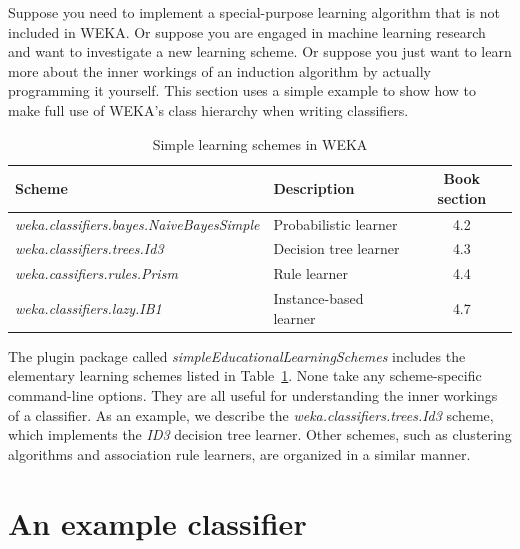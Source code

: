 Suppose you need to implement a special-purpose learning algorithm
that is not included in WEKA. Or suppose you are engaged in machine
learning research and want to investigate a new learning scheme. Or
suppose you just want to learn more about the inner workings of an
induction algorithm by actually programming it yourself. This section
uses a simple example to show how to make full use of WEKA's class
hierarchy when writing classifiers.

\begin{table}[!th]
\footnotesize
{\centering \begin{tabular}{llc}
\hline
Scheme & Description & Book section \\
\hline
\textit{weka.classifiers.bayes.NaiveBayesSimple} & Probabilistic learner & 4.2 \\
\textit{weka.classifiers.trees.Id3} & Decision tree learner & 4.3 \\
\textit{weka.cassifiers.rules.Prism} & Rule learner & 4.4 \\
\textit{weka.classifiers.lazy.IB1} & Instance-based learner & 4.7 \\
\hline
\end{tabular} \footnotesize \par}
\caption{\label{table:simple_schemes}Simple learning schemes in WEKA}
\end{table}


The plugin package called \textit{simpleEducationalLearningSchemes}
includes the elementary learning schemes listed in
Table~\ref{table:simple_schemes}. None take any scheme-specific
command-line options. They are all useful for understanding the inner
workings of a classifier. As an example, we describe
the \textit{weka.classifiers.trees.Id3} scheme, which implements
the \textit{ID3} decision tree learner. Other schemes, such as
clustering algorithms and association rule learners, are organized in
a similar manner.

\section{An example classifier}

